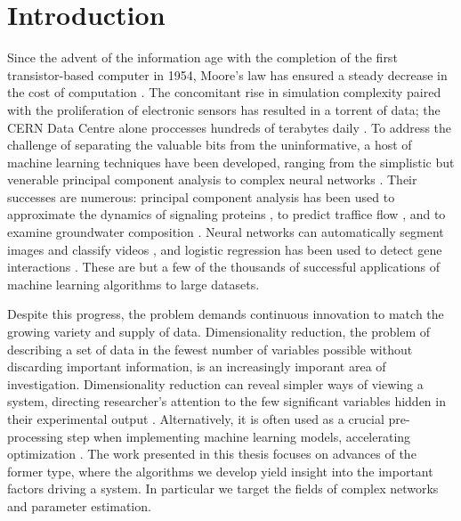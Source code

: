 \chapter{Introduction\label{ch:intro}}

Since the advent of the information age with the completion of the
first transistor-based computer in 1954, Moore's law has ensured a
steady decrease in the cost of computation \cite{Moore's law: past,
  present and future}. The concomitant rise in simulation complexity
paired with the proliferation of electronic sensors has resulted in a
torrent of data; the CERN Data Centre alone proccesses hundreds of
terabytes daily \cite{How to deal with petabytes of data: the LHC Grid
  project}. To address the challenge of separating the valuable bits
from the uninformative, a host of machine learning techniques have
been developed, ranging from the simplistic but venerable principal
component analysis to complex neural networks \cite{Hotelling,The
  Handbook of Brain Theory and Neural Networks, A Global Geometric
  Framework for Nonlinear Dimensionality Reduction, DMAPS}. Their
successes are numerous: principal component analysis has been used to
approximate the dynamics of signaling proteins \cite{Parallel imaging
  of Drosophila embryos for quantitative analysis of genetic
  perturbations of the Ras pathway}, to predict traffice flow
\cite{zhang_forecasting_2007}, and to examine groundwater composition
\cite{helena_temporal_2000}. Neural networks can automatically segment
images and classify videos
\cite{karpathy_large-scale_2014,zheng_conditional_2015}, and logistic
regression has been used to detect gene interactions
\cite{park_penalized_2008}. These are but a few of the thousands of
successful applications of machine learning algorithms to large
datasets.

Despite this progress, the problem demands continuous innovation to
match the growing variety and supply of data. Dimensionality
reduction, the problem of describing a set of data in the fewest
number of variables possible without discarding important information,
is an increasingly imporant area of investigation. Dimensionality
reduction can reveal simpler ways of viewing a system, directing
researcher's attention to the few significant variables hidden in
their experimental output \cite{Systematic determination of order
  parameters for chain dynamics using diffusion maps}. Alternatively,
it is often used as a crucial pre-processing step when implementing
machine learning models, accelerating optimization \cite{Truncated SVD
  methods for discrete linear ill-posed problems, Efficient
  large-scale sequence comparison by locality-sensitive hashing}. The
work presented in this thesis focuses on advances of the former type,
where the algorithms we develop yield insight into the important
factors driving a system. In particular we target the fields of
complex networks and parameter estimation.

